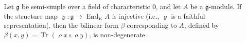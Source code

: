 Let $\mathfrak{g}$ be semi-simple over a field of characteristic $0$, and let $A$ be a $\mathfrak{g}$-module. If the structure map $\varrho : \mathfrak{g} \rightarrow \operatorname{End}_K A$ is injective (i.e., $\varrho$ is a faithful representation), then the bilinear form $\beta$ corresponding to $A$, defined by $\beta(x, y) = \operatorname{Tr}(\varrho x \circ \varrho y)$, is non-degenerate.
